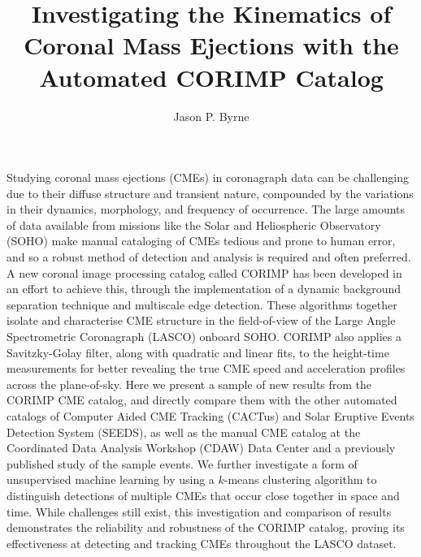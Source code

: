 \documentclass[referee,a4paper,12pt,traditabstract]{swsc}
\begin{document}
\begin{linenumbers}

   \title{Investigating the Kinematics of Coronal Mass Ejections with the Automated CORIMP Catalog}
   


   \author{Jason P. Byrne}



 
  \abstract
  {
  Studying coronal mass ejections (CMEs) in coronagraph data can be challenging due to their diffuse structure and transient nature, compounded by the variations in their dynamics, morphology, and frequency of occurrence. The large amounts of data available from missions like the Solar and Heliospheric Observatory (SOHO) make manual cataloging of CMEs tedious and prone to human error, and so a robust method of detection and analysis is required and often preferred. A new coronal image processing catalog called CORIMP has been developed in an effort to achieve this, through the implementation of a dynamic background separation technique and multiscale edge detection. These algorithms together isolate and characterise CME structure in the field-of-view of the Large Angle Spectrometric Coronagraph (LASCO) onboard SOHO. CORIMP also applies a Savitzky-Golay filter, along with quadratic and linear fits, to the height-time measurements for better revealing the true CME speed and acceleration profiles across the plane-of-sky. Here we present a sample of new results from the CORIMP CME catalog, and directly compare them with the other automated catalogs of Computer Aided CME Tracking (CACTus) and Solar Eruptive Events Detection System (SEEDS), as well as the manual CME catalog at the Coordinated Data Analysis Workshop (CDAW) Data Center and a previously published study of the sample events. We further investigate a form of unsupervised machine learning by using a $k$-means clustering algorithm to distinguish detections of multiple CMEs that occur close together in space and time. While challenges still exist, this investigation and comparison of results demonstrates the reliability and robustness of the CORIMP catalog, proving its effectiveness at detecting and tracking CMEs throughout the LASCO dataset.
  }
  

\end{linenumbers}
\end{document}
